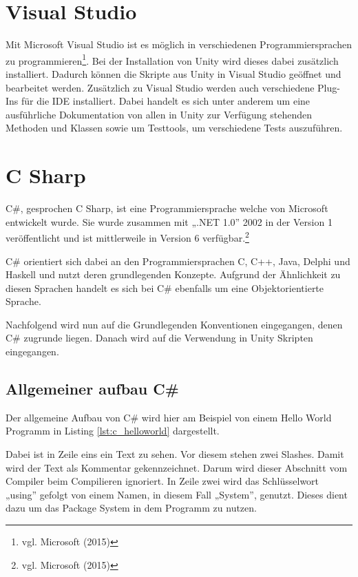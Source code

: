 \section{Visual Studio}

	Mit Microsoft Visual Studio ist es möglich in verschiedenen Programmiersprachen zu programmieren\footnote{vgl. Microsoft \cite{microsoft1} (2015)}. Bei der Installation von Unity wird dieses dabei zusätzlich installiert. Dadurch können die Skripte aus Unity in Visual Studio geöffnet und bearbeitet werden. Zusätzlich zu Visual Studio werden auch verschiedene Plug-Ins für die IDE installiert. Dabei handelt es sich unter anderem um eine ausführliche Dokumentation von allen in Unity zur Verfügung stehenden Methoden und Klassen sowie um Testtools, um verschiedene Tests auszuführen. 

\section{C Sharp}

	C\#, gesprochen C Sharp, ist eine Programmiersprache welche von Microsoft entwickelt wurde. Sie wurde zusammen mit „.NET 1.0” 2002 in der Version 1 veröffentlicht und ist mittlerweile in Version 6 verfügbar.\footnote{vgl. Microsoft \cite{microsoft2} (2015)} 

	C\# orientiert sich dabei an den Programmiersprachen C, C++, Java, Delphi und Haskell und nutzt deren grundlegenden Konzepte. Aufgrund der Ähnlichkeit zu diesen Sprachen handelt es sich bei C\# ebenfalls um eine Objektorientierte Sprache. 

	Nachfolgend wird nun auf die Grundlegenden Konventionen eingegangen, denen C\# zugrunde liegen. Danach wird auf die Verwendung in Unity Skripten eingegangen.

\subsection{Allgemeiner aufbau C\#}

	Der allgemeine Aufbau von C\# wird hier am Beispiel von einem Hello World Programm in Listing \ref{lst:c_helloworld} dargestellt. 

	Dabei ist in Zeile eins ein Text zu sehen. Vor diesem stehen zwei Slashes. Damit wird der Text als Kommentar gekennzeichnet. Darum wird dieser Abschnitt vom Compiler beim Compilieren ignoriert. In Zeile zwei wird das Schlüsselwort „using” gefolgt von einem Namen, in diesem Fall „System”, genutzt. Dieses dient dazu um das Package System in dem Programm zu nutzen.

